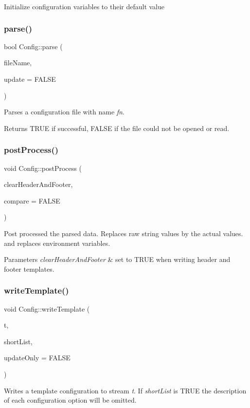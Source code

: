 Initialize configuration variables to their default value \mbox{\label{namespace_config_a0a4bebb4ccf9e25679204573753f1a15}} 
\subsubsection{\texorpdfstring{parse()}{parse()}}
{\footnotesize\ttfamily bool Config\+::parse (\begin{DoxyParamCaption}\item[{const char $\ast$}]{file\+Name,  }\item[{bool}]{update = {\ttfamily FALSE} }\end{DoxyParamCaption})}

Parses a configuration file with name {\itshape fn}. \begin{DoxyReturn}{Returns}
T\+R\+UE if successful, F\+A\+L\+SE if the file could not be opened or read. 
\end{DoxyReturn}
\mbox{\label{namespace_config_a8cfddad5eb7c03beb96eddf1e78779db}} 
\subsubsection{\texorpdfstring{postProcess()}{postProcess()}}
{\footnotesize\ttfamily void Config\+::post\+Process (\begin{DoxyParamCaption}\item[{bool}]{clear\+Header\+And\+Footer,  }\item[{bool}]{compare = {\ttfamily FALSE} }\end{DoxyParamCaption})}

Post processed the parsed data. Replaces raw string values by the actual values. and replaces environment variables. 
\begin{DoxyParams}{Parameters}
{\em clear\+Header\+And\+Footer} & set to T\+R\+UE when writing header and footer templates. \\
\hline
\end{DoxyParams}
\mbox{\label{namespace_config_ad762288cc87bc2cfc411ce419a4453f5}} 
\subsubsection{\texorpdfstring{writeTemplate()}{writeTemplate()}}
{\footnotesize\ttfamily void Config\+::write\+Template (\begin{DoxyParamCaption}\item[{\mbox{\hyperlink{class_f_text_stream}{F\+Text\+Stream}} \&}]{t,  }\item[{bool}]{short\+List,  }\item[{bool}]{update\+Only = {\ttfamily FALSE} }\end{DoxyParamCaption})}

Writes a template configuration to stream {\itshape t}. If {\itshape short\+List} is {\ttfamily T\+R\+UE} the description of each configuration option will be omitted. 